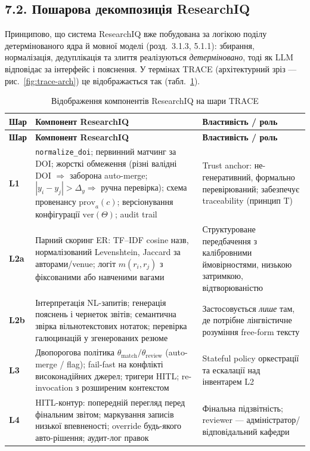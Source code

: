 \subsection*{7.2. Пошарова декомпозиція ResearchIQ}

Принципово, що система ResearchIQ вже побудована за логікою поділу детермінованого ядра й мовної моделі (розд.~3.1.3, 5.1.1): збирання, нормалізація, дедуплікація та злиття реалізуються \emph{детерміновано}, тоді як LLM відповідає за інтерфейс і пояснення. У термінах TRACE (архітектурний зріз --- рис.~\ref{fig:trace-arch}) це відображається так (табл.~\ref{tab:trace-layers}).

\begin{longtable}{@{}p{}p{}p{}@{}}
\caption{Відображення компонентів ResearchIQ на шари TRACE}\label{tab:trace-layers}\\
\toprule
\textbf{Шар} & \textbf{Компонент ResearchIQ} & \textbf{Властивість / роль} \\
\midrule
\endfirsthead
\toprule
\textbf{Шар} & \textbf{Компонент ResearchIQ} & \textbf{Властивість / роль} \\
\midrule
\endhead
\textbf{L1} & \texttt{normalize\_doi}; первинний матчинг за DOI; жорсткі обмеження (різні валідні DOI $\Rightarrow$ заборона auto-merge; $|y_i-y_j|>\Delta_y \Rightarrow$ ручна перевірка); схема провенансу $\mathrm{prov}_a(c)$; версіонування конфігурації $\mathrm{ver}(\Theta)$; audit trail & Trust anchor: не-генеративний, формально перевірюваний; забезпечує traceability (принцип T) \\
\textbf{L2a} & Парний скоринг ER: TF--IDF cosine назв, нормалізований Levenshtein, Jaccard за авторами/venue; логіт $m(r_i,r_j)$ з фіксованими або навченими вагами & Структуроване передбачення з калібровними ймовірностями, низькою затримкою, відтворюваністю \\
\textbf{L2b} & Інтерпретація NL-запитів; генерація пояснень і чернеток звітів; семантична звірка вільнотекстових нотаток; перевірка галюцинацій у згенерованих резюме & Застосовується \emph{лише} там, де потрібне лінгвістичне розуміння free-form тексту \\
\textbf{L3} & Двопорогова політика $\theta_{\mathrm{match}}/\theta_{\mathrm{review}}$ (auto-merge / flag); fail-fast на конфлікті високонадійних джерел; тригери HITL; re-invocation з розширеним контекстом & Stateful policy оркестрації та ескалації над інвентарем L2 \\
\textbf{L4} & HITL-контур: попередній перегляд перед фінальним звітом; маркування записів низької впевненості; override будь-якого авто-рішення; аудит-лог правок & Фінальна підзвітність; reviewer --- адміністратор/відповідальний кафедри \\
\bottomrule
\end{longtable}

